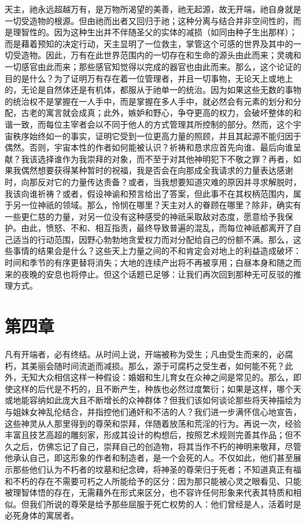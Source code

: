 天主，祂永远超越万有，是万物所渴望的美善，祂无起源，故无开端，祂自身就是一切受造物的根源。但由祂而出者又回归于祂；这种分离与结合并非空间性的，而是理智性的。因为这种生出并不伴随圣父的实体的减损（如同由种子生出那样）；而是藉着预知的决定行动，天主显明了一位救主，掌管这个可感的世界及其中的一切受造物。因此，万有在此世界范围内的一切存在和生命的源头由此而来；灵魂和一切感官由此而来；那些感官知觉得以完成的器官也由此而来。那么，这个论证的目的是什么？为了证明万有存在着一位管理者，并且一切事物，无论天上或地上的，无论是自然体还是有机体，都服从于祂单一的统治。因为如果这些无数的事物的统治权不是掌握在一人手中，而是掌握在多人手中，就必然会有元素的划分和分配，古老的寓言就会成真；此外，嫉妒和野心，争夺更高的权力，会破坏整体的和谐一致，而每位主宰者会以不同于他人的方式管理其所控制的部分。然而，这个宇宙秩序始终如一的事实，证明它受到一位更高力量的照顾，并且其起源不能归因于偶然。否则，宇宙本性的作者如何能被认识？祈祷和恳求应首先向谁、最后向谁呈献？我该选择谁作为我崇拜的对象，而不至于对其他神明犯下不敬之罪？再者，如果我偶然想要获得某种暂时的祝福，我是否会在向那成全我请求的力量表达感谢时，向那反对它的力量传达责备？或者，当我想要知道灾难的原因并寻求解脱时，我该向谁祈祷？或者，假设神谕和预言给出了答案，但此事不在其权柄范围内，属于另一位神祇的领域。那么，怜悯在哪里？天主对人的眷顾在哪里？除非，确实有一些更仁慈的力量，对另一位没有这种感受的神祇采取敌对态度，愿意给予我保护。由此，愤怒、不和、相互指责，最终导致普遍的混乱，而每位神祇都离开了自己适当的行动范围，因野心勃勃地贪爱权力而对分配给自己的份额不满。那么，这些事情的结果会是什么？这些天上力量之间的不和肯定会对地上的利益造成破坏：时间和季节的有序更替将消失；大地的连续产出将不再被享用；白昼本身和随之而来的夜晚的安息也将停止。但这个话题已足够：让我们再次回到那种无可反驳的推理方式。\par


\section{第四章 }

凡有开端者，必有终结。从时间上说，开端被称为受生；凡由受生而来的，必腐朽，其美丽会随时间流逝而减损。那么，源于可腐朽之受生者，如何能不死？此外，无知大众相信这样一种假设：婚姻和生儿育女在众神之间是常见的。那么，即使这样的后代是不朽的，且不断产生，种族也必然过度繁衍；如果是这样，哪个天或地能容纳如此庞大且不断增长的众神群体？但我们该如何谈论那些将天神描绘为与姐妹女神乱伦结合，并指控他们通奸和不洁的人？我们进一步满怀信心地宣告，这些神灵从人那里得到的尊荣和崇拜，伴随着放荡和荒淫的行为。再说一次，经验丰富且技艺高超的雕刻家，形成其设计的构想后，按照艺术规则完善其作品；但不久之后，仿佛忘记了自己，崇拜自己的创造物，将其当作不朽的神明来敬拜，尽管他承认自己，即这形象的作者和制造者，是一个会死的人。不仅如此，他们甚至展示那些他们认为不朽者的坟墓和纪念碑，将神圣的尊荣归于死者；不知道真正有福和不朽的存在不需要可朽之人所能给予的区分：因为那只能被心灵之眼看见、只能被理智体悟的存在，无需藉外在形式来区分，也不容许任何形象来代表其特质和相似。但我们所说的尊荣是给予那些屈服于死亡权势的人：他们曾经是人，活着时是必死身体的寓居者。\par

